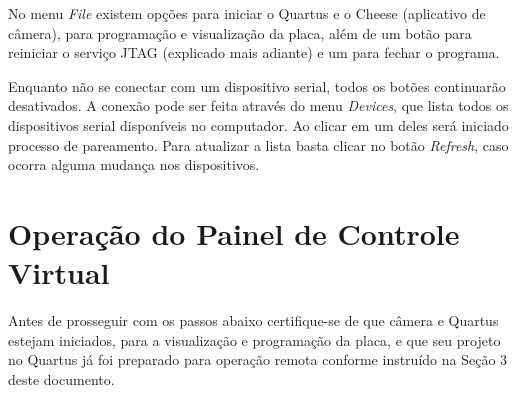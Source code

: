 \documentclass[12pt]{article}
\begin{document}
No menu \textit{File} existem opções para iniciar o Quartus e o Cheese (aplicativo de câmera), para programação e visualização da placa, além de um botão para reiniciar o serviço JTAG (explicado mais adiante) e um para fechar o programa.

Enquanto não se conectar com um dispositivo serial, todos os botões continuarão desativados.
A conexão pode ser feita através do menu \textit{Devices}, que lista todos os dispositivos serial disponíveis no computador.
Ao clicar em um deles será iniciado processo de pareamento.
Para atualizar a lista basta clicar no botão \textit{Refresh}, caso ocorra alguma mudança nos dispositivos.

\section{Operação do Painel de Controle Virtual}
Antes de prosseguir com os passos abaixo certifique-se de que câmera e Quartus estejam iniciados, para a visualização e programação da placa, e que seu projeto no Quartus já foi preparado para operação remota conforme instruído na Seção 3 deste documento.
\end{document}
